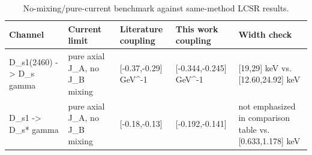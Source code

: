 \begin{table}[t]
\centering
\caption{No-mixing/pure-current benchmark against same-method LCSR results.}
\label{tab:no-mixing-method-check}
\begin{tabular}{lllll}
\toprule
Channel & Current limit & Literature coupling & This work coupling & Width check\\
\midrule
D_s1(2460) -> D_s gamma & pure axial J_A, no J_B mixing & [-0.37,-0.29] GeV^-1 & [-0.344,-0.245] GeV^-1 & [19,29] keV vs. [12.60,24.92] keV\\
D_s1 -> D_s* gamma & pure axial J_A, no J_B mixing & [-0.18,-0.13] & [-0.192,-0.141] & not emphasized in comparison table vs. [0.633,1.178] keV\\
\bottomrule
\end{tabular}
\end{table}
